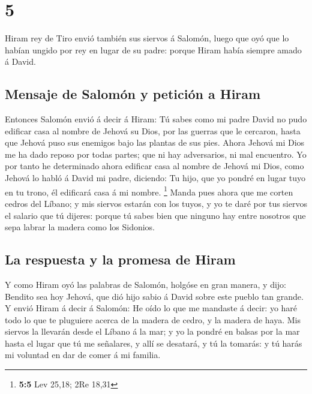\hypertarget{section-4}{%
\section{5}\label{section-4}}

 Hiram rey de Tiro envió también sus siervos á Salomón,
luego que oyó que lo habían ungido por rey en lugar de su padre: porque
Hiram había siempre amado á David.

\hypertarget{mensaje-de-salomuxf3n-y-peticiuxf3n-a-hiram}{%
\subsection{Mensaje de Salomón y petición a
Hiram}\label{mensaje-de-salomuxf3n-y-peticiuxf3n-a-hiram}}

 Entonces Salomón envió á decir á Hiram:  Tú
sabes como mi padre David no pudo edificar casa al nombre de Jehová su
Dios, por las guerras que le cercaron, hasta que Jehová puso sus
enemigos bajo las plantas de sus pies.  Ahora Jehová mi Dios
me ha dado reposo por todas partes; que ni hay adversarios, ni mal
encuentro.  Yo por tanto he determinado ahora edificar casa
al nombre de Jehová mi Dios, como Jehová lo habló á David mi padre,
diciendo: Tu hijo, que yo pondré en lugar tuyo en tu trono, él edificará
casa á mi nombre. \footnote{\textbf{5:5} Lev 25,18; 2Re 18,31}
 Manda pues ahora que me corten cedros del Líbano; y mis
siervos estarán con los tuyos, y yo te daré por tus siervos el salario
que tú dijeres: porque tú sabes bien que ninguno hay entre nosotros que
sepa labrar la madera como los Sidonios.

\hypertarget{la-respuesta-y-la-promesa-de-hiram}{%
\subsection{La respuesta y la promesa de
Hiram}\label{la-respuesta-y-la-promesa-de-hiram}}

 Y como Hiram oyó las palabras de Salomón, holgóse en gran
manera, y dijo: Bendito sea hoy Jehová, que dió hijo sabio á David sobre
este pueblo tan grande.  Y envió Hiram á decir á Salomón: He
oído lo que me mandaste á decir: yo haré todo lo que te pluguiere acerca
de la madera de cedro, y la madera de haya.  Mis siervos la
llevarán desde el Líbano á la mar; y yo la pondré en balsas por la mar
hasta el lugar que tú me señalares, y allí se desatará, y tú la tomarás:
y tú harás mi voluntad en dar de comer á mi familia.

